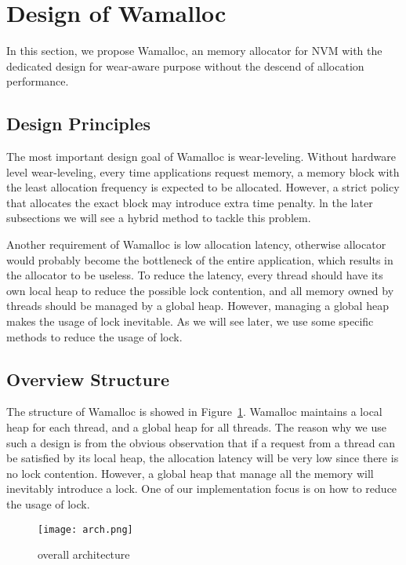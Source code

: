 \documentclass[10pt, conference, compsocconf]{IEEEtran}
\begin{document}
\section{Design of Wamalloc}

In this section, we propose Wamalloc, 
an memory allocator for NVM with the dedicated design for wear-aware purpose 
without the descend of allocation performance.

\subsection{Design Principles}

The most important design goal of Wamalloc is wear-leveling. 
Without hardware level wear-leveling, every time applications request memory,
a memory block with the least allocation frequency is expected to be allocated.
However, a strict policy that allocates the exact block may introduce extra time penalty.
ln the later subsections we will see a hybrid method to tackle this problem.

Another requirement of Wamalloc is low allocation latency,
otherwise allocator would probably become the bottleneck of the entire application,
which results in the allocator to be useless. 
To reduce the latency, every thread should have its own local heap to reduce the possible lock contention,
and all memory owned by threads should be managed by a global heap.
However, managing a global heap makes the usage of lock inevitable.
As we will see later, we use some specific methods to reduce the usage of lock.

\subsection{Overview Structure}

The structure of Wamalloc is showed in Figure~\ref{fig:arch}.
Wamalloc maintains a local heap for each thread, and a global heap for all threads.
The reason why we use such a design is from the obvious observation that if a request from a thread can be satisfied by its local heap,
the allocation latency will be very low since there is no lock contention.
However, a global heap that manage all the memory will inevitably introduce a lock.
One of our implementation focus is on how to reduce the usage of lock.

\begin{figure}
\centering
\texttt{[image: arch.png]}
\caption{overall architecture}
\label{fig:arch}
\end{figure}
\end{document}
